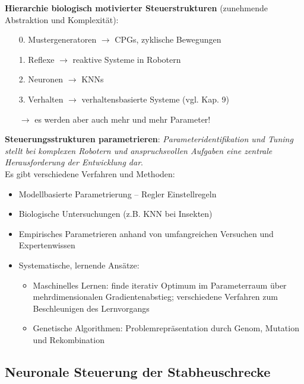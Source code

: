 \textbf{Hierarchie biologisch motivierter Steuerstrukturen} (zunehmende Abstraktion und Komplexität):
\begin{itemize}
\item[0.] Mustergeneratoren $\rightarrow$ CPGs, zyklische Bewegungen
\item[1.] Reflexe $\rightarrow$ reaktive Systeme in Robotern
\item[2.] Neuronen $\rightarrow$ KNNs
\item[3.] Verhalten $\rightarrow$ verhaltensbasierte Systeme (vgl. Kap. 9)
\item[$\rightarrow$] es werden aber auch mehr und mehr Parameter!
\end{itemize}
\textbf{Steuerungsstrukturen parametrieren}: \textit{Parameteridentifikation und Tuning stellt bei komplexen
Robotern und anspruchsvollen Aufgaben eine zentrale Herausforderung der Entwicklung dar}.\\ 
Es gibt verschiedene Verfahren und Methoden:
\begin{itemize}
\item Modellbasierte Parametrierung – \glqq Regler Einstellregeln\grqq
\item Biologische Untersuchungen (z.B. KNN bei Insekten)
\item Empirisches Parametrieren anhand von umfangreichen Versuchen und Expertenwissen
\item Systematische, lernende Ansätze: 
\begin{itemize}
\item Maschinelles Lernen: finde iterativ Optimum im Parameterraum über mehrdimensionalen Gradientenabstieg; verschiedene Verfahren zum Beschleunigen des Lernvorgangs
\item Genetische Algorithmen: Problemrepräsentation durch \glqq Genom\grqq, Mutation und Rekombination
\end{itemize}
\end{itemize}
\subsection{Neuronale Steuerung der Stabheuschrecke}
